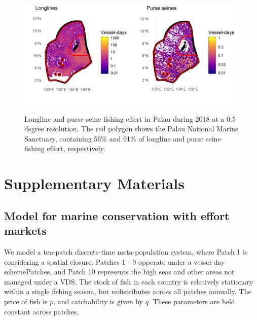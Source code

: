\documentclass[12pt]{article}
\begin{document}
\begin{figure}
\centering
\includegraphics{img/plw_2018.png}
\caption{\label{fig:plw_2018}Longline and purse seine fishing effort in Palau during 2018 at a 0.5 degree resolution. The red polygon shows the Palau National Marine Sanctuary, containing 56\% and 91\% of longline and purse seine fishing effort, respectively.}
\end{figure}


\clearpage

\FloatBarrier

\newcommand{\beginsupplement}{\setcounter{table}{0}  \renewcommand{\thetable}{S\arabic{table}} \setcounter{figure}{0} \renewcommand{\thefigure}{S\arabic{figure}}}

\setcounter{table}{0}  \renewcommand{\thetable}{S\arabic{table}} \setcounter{figure}{0} \renewcommand{\thefigure}{S\arabic{figure}}

\section{Supplementary Materials}

\subsection{Model for marine conservation with effort markets}

We model a ten-patch discrete-time meta-population system, where Patch 1 is considering a spatial closure. Patches 1 - 9 opperate under a vessel-day schemePatches, and Patch 10 represents the high seas and other areas not managed under a VDS. The stock of fish in each country is relatively stationary within a single fishing season, but redistributes across all patches annually. The price of fish is $p$, and catchability is given by $q$. These parameters are held constant across patches.
\end{document}
